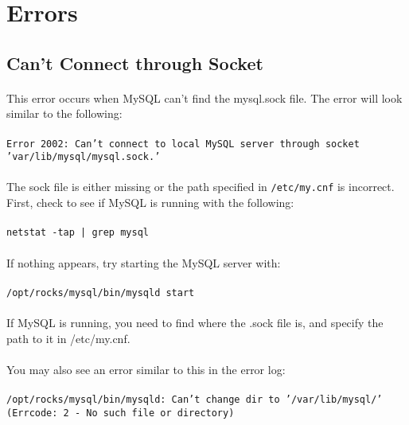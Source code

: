 \documentclass[12pt]{article}
\begin{document}
\section{Errors}
\subsection{Can't Connect through Socket}
\paragraph{} This error occurs when MySQL can't find the mysql.sock file. The error will look similar to the following:
\paragraph{}{\tt Error 2002: Can't connect to local MySQL server through socket 'var/lib/mysql/mysql.sock.'}
\paragraph{}The sock file is either missing or the path specified in {\tt/etc/my.cnf} is incorrect. First, check to see if MySQL is running with the following:
\paragraph{}{\tt netstat -tap | grep mysql}
\paragraph{}If nothing appears, try starting the MySQL server with:
\paragraph{}{\tt /opt/rocks/mysql/bin/mysqld start}
\paragraph{}If MySQL is running, you need to find where the .sock file is, and specify the path to it in /etc/my.cnf.
\paragraph{}You may also see an error similar to this in the error log:
\paragraph{}{\tt /opt/rocks/mysql/bin/mysqld: Can't change dir to '/var/lib/mysql/' (Errcode: 2 - No such file or directory) }
\end{document}

